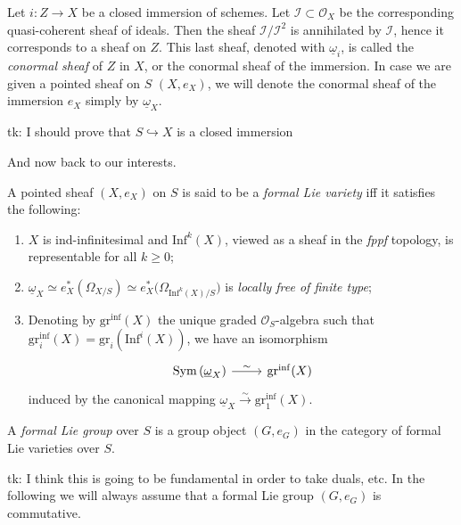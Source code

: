 \documentclass[../Main]{subfiles}
\begin{document}
\begin{defn}
	Let $i\colon Z \to X$ be a closed immersion of schemes.
	Let $\mathcal{I} \subset \mathcal{O}_X$ be the corresponding
	quasi-coherent sheaf of ideals.
	Then the sheaf $\mathcal{I}/\mathcal{I}^2$ is annihilated by $\mathcal{I}$,
	hence it corresponds to a sheaf on $Z$.
	This last sheaf, denoted with $\underline{\omega}_i$, is called the {\em conormal
	sheaf} of $Z$ in $X$, or the conormal sheaf of the immersion.
	In case we are given a pointed sheaf on $S$ $\left(X, e_X\right)$, we will denote 
	the conormal sheaf of the immersion $e_X$ simply by
	$\underline{\omega}_X$.
\end{defn}
tk: I should prove that $S \hookrightarrow X$ is a closed immersion


And now back to our interests.
\begin{defn}
	A pointed sheaf $\left(X, e_X\right)$ on $S$ is said to be
	a {\em formal Lie variety} iff it satisfies the following:
\begin{enumerate}
	\item $X$ is ind-infinitesimal and $\mathrm{Inf}^k(X)$, viewed
		as a sheaf in the {\em fppf} topology,
		is representable for all $k \geq 0$;
	\item $\underline{\omega}_X \simeq
		e_X^* \left( \Omega_{X/S} \right) \simeq
		e_X^* \big( \Omega_{\mathrm{Inf}^k(X)/S} \big)$
		is {\em locally free of finite type};
	\item Denoting by $\mathrm{gr}^{\mathrm{inf}}(X)$ the unique graded $\mathcal{O}_{ S }$-algebra
		such that $\mathrm{gr}^{\mathrm{inf}}_i(X) = \mathrm{gr}_i(\mathrm{Inf}^i(X))$,
		we have an isomorphism
		\begin{equation*}
		\begin{tikzcd}[row sep = 0ex
			,/tikz/column 1/.append style={anchor=base east}
			,/tikz/column 2/.append style={anchor=base west}]
		\mathrm{Sym}\left( \underline{\omega}_X \right) \arrow[r, "\sim", rightarrow] &
				\mathrm{gr}^{\mathrm{inf}}(X)
		\end{tikzcd}
		\end{equation*}
		induced by the canonical mapping
		$\underline{\omega}_X \xrightarrow{\sim} \mathrm{gr}_1^{\mathrm{inf}}(X)$.
\end{enumerate}
\end{defn}


\begin{defn}
	A {\em formal Lie group} over $S$ is a group object $\left(G, e_G\right)$
	in the category of formal Lie varieties over $S$.
\end{defn}
tk: I think this is going to be fundamental in order to take duals, etc.
In the following we will always assume that a formal Lie group $\left(G, e_G\right)$
is commutative.
\end{document}
